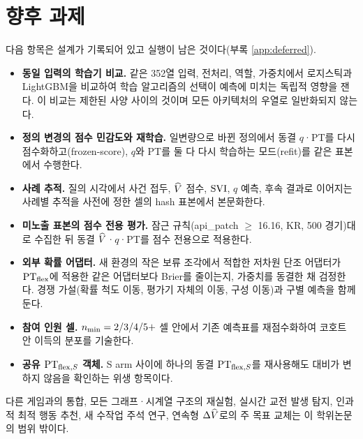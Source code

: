 \section{향후 과제}
\label{sec:disc-future}

다음 항목은 설계가 기록되어 있고 실행이 남은 것이다(부록 \ref{app:deferred}).

\begin{itemize}[leftmargin=1.5em]
  \item \textbf{동일 입력의 학습기 비교.} 같은 352열 입력, 전처리, 역할, 가중치에서 로지스틱과 LightGBM을 비교하여 학습 알고리즘의 선택이 예측에 미치는 독립적 영향을 잰다. 이 비교는 제한된 사양 사이의 것이며 모든 아키텍처의 우열로 일반화되지 않는다.
  \item \textbf{정의 변경의 점수 민감도와 재학습.} 일변량으로 바뀐 정의에서 동결 $q$·PT를 다시 점수화하고(frozen-score), $q$와 PT를 둘 다 다시 학습하는 모드(refit)를 같은 표본에서 수행한다.
  \item \textbf{사례 추적.} 질의 시각에서 사건 접두, $\widehat V$ 점수, $\mathrm{SVI}$, $q$ 예측, 후속 결과로 이어지는 사례별 추적을 사전에 정한 셀의 hash 표본에서 본문화한다.
  \item \textbf{미노출 표본의 점수 전용 평가.} 잠근 규칙(api\_patch $\ge$ 16.16, KR, 500 경기)대로 수집한 뒤 동결 $\widehat V$·$q$·PT를 점수 전용으로 적용한다.
  \item \textbf{외부 확률 어댑터.} 새 환경의 작은 보류 조각에서 적합한 저차원 단조 어댑터가 $\mathrm{PT}_{\mathrm{flex}}$에 적용한 같은 어댑터보다 Brier를 줄이는지, 가중치를 동결한 채 검정한다. 경쟁 가설(확률 척도 이동, 평가기 자체의 이동, 구성 이동)과 구별 예측을 함께 둔다.
  \item \textbf{참여 인원 셀.} $n_{\min} = 2 / 3 / 4 / 5+$ 셀 안에서 기존 예측표를 재점수화하여 코호트 안 이득의 분포를 기술한다.
  \item \textbf{공유 $\mathrm{PT}_{\mathrm{flex},S}$ 객체.} S arm 사이에 하나의 동결 $\mathrm{PT}_{\mathrm{flex},S}$를 재사용해도 대비가 변하지 않음을 확인하는 위생 항목이다.
\end{itemize}

다른 게임과의 통합, 모든 그래프·시계열 구조의 재실험, 실시간 교전 발생 탐지, 인과적 최적 행동 추천, 새 수작업 주석 연구, 연속형 $\Delta\widehat V$로의 주 목표 교체는 이 학위논문의 범위 밖이다.
